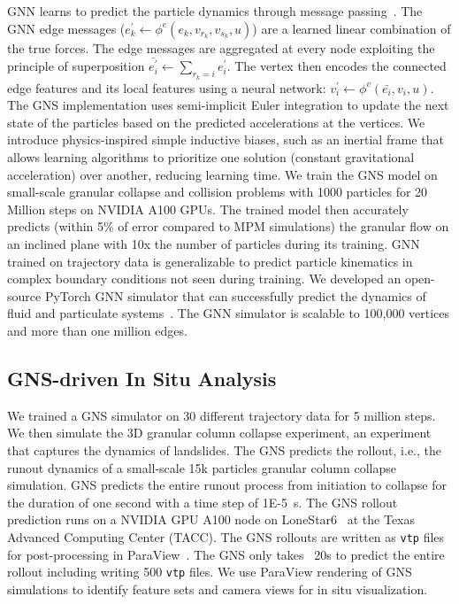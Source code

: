 \documentclass{vgtc}
\newcommand{\code}[1]{\texttt{#1}}
\begin{document}
GNN learns to predict the particle dynamics through message passing~\cite{sanchez2020learning}.  The GNN edge messages  ($e^\prime_k \leftarrow \phi^e(e_k, v_{r_k}, v_{s_k}, u)$) are a learned linear combination of the true forces.  The edge messages are aggregated at every node exploiting the principle of superposition $\bar{e_i^\prime} \leftarrow \sum_{r_k = i} e_i^\prime$.  The vertex then encodes the connected edge features and its local features using a neural network: $v_i^\prime \leftarrow \phi^v (\bar{e_i}, v_i, u)$.  The GNS implementation uses semi-implicit Euler integration to update the next state of the particles based on the predicted accelerations at the vertices.  We introduce physics-inspired simple inductive biases, such as an inertial frame that allows learning algorithms to prioritize one solution (constant gravitational acceleration) over another, reducing learning time.  We train the GNS model on small-scale granular collapse and collision problems with 1000 particles for 20 Million steps on NVIDIA A100 GPUs.  The trained model then accurately predicts (within 5\% of error compared to MPM simulations) the granular flow on an inclined plane with 10x the number of particles during its training.  GNN trained on trajectory data is generalizable to predict particle kinematics in complex boundary conditions not seen during training.  We developed an open-source PyTorch GNN simulator that can successfully predict the dynamics of fluid and particulate systems~\cite{Kumar_Graph_Network_Simulator_2022}.  The GNN simulator is scalable to 100,000 vertices and more than one million edges.


\subsection{GNS-driven In Situ Analysis}

We trained a GNS simulator on 30 different trajectory data for 5 million steps.  We then simulate the 3D granular column collapse experiment, an experiment that captures the dynamics of landslides. The GNS predicts the rollout, i.e., the runout dynamics of a small-scale 15k particles granular column collapse simulation.  GNS predicts the entire runout process from initiation to collapse for the duration of one second with a time step of 1E-5~s.  The GNS rollout prediction runs on a NVIDIA GPU A100 node on  LoneStar6~\cite{lonestar6} at the Texas Advanced Computing Center (TACC).  The GNS rollouts are written as \code{vtp} files for post-processing in ParaView~\cite{ayachit15paraview}.  The GNS only takes ~20s to predict the entire rollout including writing 500 \code{vtp} files.  We use ParaView rendering of GNS simulations to identify feature sets and camera views for in situ visualization.
\end{document}
